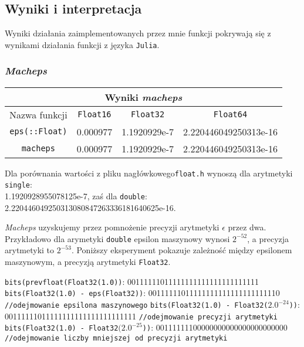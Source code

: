 \documentclass[a4paper]{article}
\begin{document}
\subsection{Wyniki i interpretacja}
Wyniki działania zaimplementowanych przez mnie funkcji pokrywają się z wynikami działania funkcji z języka \texttt{Julia}.

\subsubsection{\textit{Macheps}}

\begin{center}
 \begin{tabular}{ ||c | c | c | c||  }
 \hline
 \multicolumn{4}{|c|}{Wyniki \textit{macheps}} \\
 \hline
 Nazwa funkcji & \texttt{Float16} & \texttt{Float32}&\texttt{Float64}\\
 \hline
 \texttt{eps(::Float)} & 0.000977 & 1.1920929e-7 & 2.220446049250313e-16\\
 \texttt{macheps} & 0.000977 & 1.1920929e-7 & 2.220446049250313e-16\\
 \hline
\end{tabular}
\end{center}

Dla porównania wartości z pliku nagłówkowego\texttt{float.h}  wynoszą dla arytmetyki \texttt{single}: \\1.1920928955078125e-7, zaś dla \texttt{double}:  2.220446049250313080847263336181640625e-16.

\begin{framed}
\textit{Macheps} uzyskujemy przez pomnożenie precyzji arytmetyki $\epsilon$ przez dwa. Przykładowo dla arymetyki \texttt{double} epsilon maszynowy wynosi $2^{-52}$, a precyzja arytmetyki to $2^{-53}$. Poniższy eksperyment pokazuje zależność między epsilonem maszynowym, a precyzją arytmetyki \texttt{Float32}.
\newline

\small {
\texttt{bits(prevfloat(Float32(1.0))}: 00111111011111111111111111111111
\texttt{bits(Float32(1.0) - eps(Float32))}: 00111111011111111111111111111110
\texttt{//odejmowanie epsilona maszynowego}
\newline
\texttt{bits(Float32(1.0) - Float32($2.0^{-24}$))}: 00111111011111111111111111111111 \texttt{//odejmowanie precyzji arytmetyki}
\newline
\texttt{bits(Float32(1.0) - Float32$(2.0^{-25}$))}: 00111111100000000000000000000000 \texttt{//odejmowanie liczby mniejszej od precyzji arytmetyki}
}
\end{framed}
\end{document}
